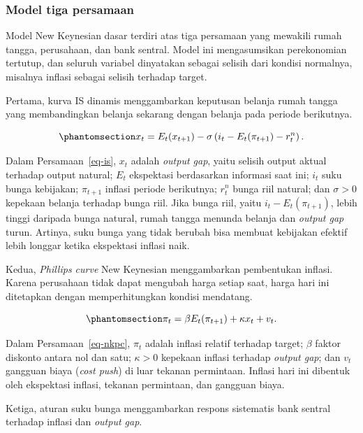 \documentclass[
  manuscript=article,
  layout=brief,
  year=2026,
  volume=1,
]{den}
\begin{document}
\subsubsection{Model tiga persamaan}\label{model-tiga-persamaan}

Model New Keynesian dasar terdiri atas tiga persamaan yang mewakili
rumah tangga, perusahaan, dan bank sentral. Model ini mengasumsikan
perekonomian tertutup, dan seluruh variabel dinyatakan sebagai selisih
dari kondisi normalnya, misalnya inflasi sebagai selisih terhadap
target.

Pertama, kurva IS dinamis menggambarkan keputusan belanja rumah tangga
yang membandingkan belanja sekarang dengan belanja pada periode
berikutnya.

\begin{equation}\protect\phantomsection\label{eq-is}{
x_t = E_t(x_{t+1}) - \sigma\left(i_t - E_t(\pi_{t+1}) - r_t^n\right).
}\end{equation}

Dalam Persamaan~\ref{eq-is}, \(x_t\) adalah \emph{output gap}, yaitu
selisih output aktual terhadap output natural; \(E_t\) ekspektasi
berdasarkan informasi saat ini; \(i_t\) suku bunga kebijakan;
\(\pi_{t+1}\) inflasi periode berikutnya; \(r_t^n\) bunga riil natural;
dan \(\sigma > 0\) kepekaan belanja terhadap bunga riil. Jika bunga
riil, yaitu \(i_t - E_t(\pi_{t+1})\), lebih tinggi daripada bunga
natural, rumah tangga menunda belanja dan \emph{output gap} turun.
Artinya, suku bunga yang tidak berubah bisa membuat kebijakan efektif
lebih longgar ketika ekspektasi inflasi naik.

Kedua, \emph{Phillips curve} New Keynesian menggambarkan pembentukan
inflasi. Karena perusahaan tidak dapat mengubah harga setiap saat, harga
hari ini ditetapkan dengan memperhitungkan kondisi mendatang.

\begin{equation}\protect\phantomsection\label{eq-nkpc}{
\pi_t = \beta E_t(\pi_{t+1}) + \kappa x_t + v_t.
}\end{equation}

Dalam Persamaan~\ref{eq-nkpc}, \(\pi_t\) adalah inflasi relatif terhadap
target; \(\beta\) faktor diskonto antara nol dan satu; \(\kappa > 0\)
kepekaan inflasi terhadap \emph{output gap}; dan \(v_t\) gangguan biaya
(\emph{cost push}) di luar tekanan permintaan. Inflasi hari ini dibentuk
oleh ekspektasi inflasi, tekanan permintaan, dan gangguan biaya.

Ketiga, aturan suku bunga menggambarkan respons sistematis bank sentral
terhadap inflasi dan \emph{output gap}.
\end{document}
